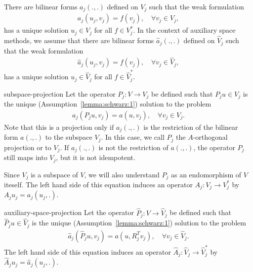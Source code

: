 \begin{assumption}
  \label{lemma:schwarz:1}
  There are bilinear forms $a_j(.,.)$ defined on $V_j$ such that the weak formulation
  \begin{gather}
    \label{eq:schwarz:1}
    a_j(u_j,v_j) = f(v_j),
    \quad\forall v_j\in V_j,
  \end{gather}
  has a unique solution $u_j\in V_j$ for all $f\in V_j^*$. In the
  context of auxiliary space methods, we assume that there are
  bilinear forms $\hat a_j(.,.)$ defined on $\hat V_j$ such
  that the weak formulation
  \begin{gather}
    \label{eq:schwarz:1a}
    \hat a_j(u_j,v_j) = f(v_j),
    \quad\forall v_j\in \hat V_j,
  \end{gather}
  has a unique solution $u_j\in \hat V_j$ for all $f\in \hat V_j^*$.
\end{assumption}

\begin{Definition}{subspace-projection}
  \label{definition:schwarz:1}
   Let the  operator $P_j: V \to V_j$ be defined such that
  $P_j u \in V_j$ is the unique (Assumption~\ref{lemma:schwarz:1})
  solution to the problem
  \begin{gather}
    \label{eq:schwarz:2}
    a_j(P_j u,v_j) = a(u,v_j),\quad\forall v_j\in V_j.
  \end{gather}
  Note that this is a projection only if $a_j(.,.)$ is the restriction
  of the bilinear form $a(.,.)$ to the subspace $V_j$. In this
  case, we call $P_j$ the $A$-orthogonal projection or
   to $V_j$. If $a_j(.,.)$ is not the
  restriction of $a(.,.)$, the operator $P_j$ still maps into $V_j$,
  but it is not idempotent.

  Since $V_j$ is a subspace of $V$, we will also understand $P_j$ as
  an endomorphism of $V$ iteself. The left hand side of this equation
  induces an operator $A_j: V_j \to V_j^*$ by $A_j u_j = a_j(u_j,.)$.
\end{Definition}

\begin{Definition}{auxiliary-space-projection}
  \label{definition:schwarz:1a}
  Let the operator $\hat P_j: V \to \hat V_j$ be defined such that $\hat P_j u \in \hat V_j$ is
  the unique (Assumption~\ref{lemma:schwarz:1}) solution to the problem
  \begin{gather}
    \label{eq:schwarz:2a}
    \hat a_j(\hat P_j u,v_j) = a(u,R_j^T v_j),\quad\forall v_j\in \hat V_j.
  \end{gather}
  The left hand side of this equation induces an operator $\hat A_j:
  \hat V_j \to \hat V_j^*$ by $\hat A_j u_j = \hat a_j(u_j,.)$.
\end{Definition}

